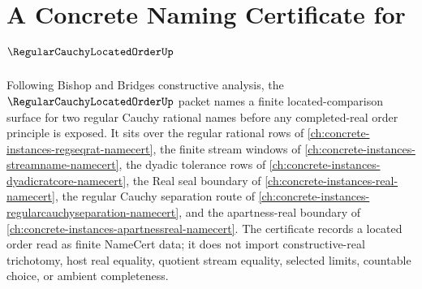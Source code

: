 \chapter{A Concrete Naming Certificate for $\RegularCauchyLocatedOrderUp$}
\label{ch:concrete-instances-regular-cauchy-located-order-namecert}

Following Bishop and Bridges constructive analysis, the $\RegularCauchyLocatedOrderUp$ packet names a finite located-comparison surface for two regular Cauchy rational names before any completed-real order principle is exposed. It sits over the regular rational rows of \autoref{ch:concrete-instances-regseqrat-namecert}, the finite stream windows of \autoref{ch:concrete-instances-streamname-namecert}, the dyadic tolerance rows of \autoref{ch:concrete-instances-dyadicratcore-namecert}, the Real seal boundary of \autoref{ch:concrete-instances-real-namecert}, the regular Cauchy separation route of \autoref{ch:concrete-instances-regularcauchyseparation-namecert}, and the apartness-real boundary of \autoref{ch:concrete-instances-apartnessreal-namecert}. The certificate records a located order read as finite NameCert data; it does not import constructive-real trichotomy, host real equality, quotient stream equality, selected limits, countable choice, or ambient completeness.

